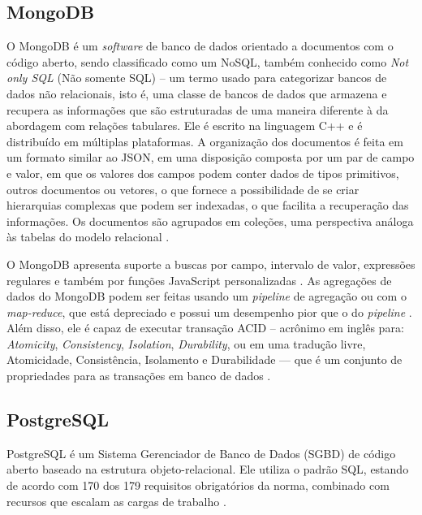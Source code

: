 \subsection{MongoDB}
\label{subsec:mongo}
O MongoDB é um \textit{software} de banco de dados orientado a documentos com o código aberto, sendo classificado como um NoSQL, também conhecido como \textit{Not only SQL} (Não somente SQL) – um termo usado para categorizar bancos de dados não relacionais, isto é, uma classe de bancos de dados que armazena e recupera as informações que são estruturadas de uma maneira diferente à da abordagem com relações tabulares. Ele é escrito na linguagem C++ e é distribuído em múltiplas plataformas. A organização dos documentos é feita em um formato similar ao JSON, em uma disposição composta por um par de campo e valor, em que os valores dos campos podem conter dados de tipos primitivos, outros documentos ou vetores, o que fornece a possibilidade de se criar hierarquias complexas que podem ser indexadas, o que facilita a recuperação das informações. Os documentos são agrupados em coleções, uma perspectiva análoga às tabelas do modelo relacional \cite{mongoDB2021}.

O MongoDB apresenta suporte a buscas por campo, intervalo de valor, expressões regulares e também por funções JavaScript personalizadas \cite{mongoDB2021}. As agregações de dados do MongoDB podem ser feitas usando um \textit{pipeline} de agregação ou com o \textit{map-reduce}, que está depreciado e possui um desempenho pior que o do \textit{pipeline} \cite{mongoDBagregacao}. Além disso, ele é capaz de executar transação ACID – acrônimo em inglês para: \textit{Atomicity}, \textit{Consistency}, \textit{Isolation}, \textit{Durability}, ou em uma tradução livre, Atomicidade, Consistência, Isolamento e Durabilidade — que é um conjunto de propriedades para as transações em banco de dados \cite{mongoDBACID}.


\subsection{PostgreSQL}
\label{subsec:postgres}
PostgreSQL é um Sistema Gerenciador de Banco de Dados (SGBD) de código aberto baseado na estrutura objeto-relacional. Ele utiliza o padrão SQL, estando de acordo com 170 dos 179 requisitos obrigatórios da norma, combinado com recursos que escalam as cargas de trabalho \cite{postgresAbout}.

